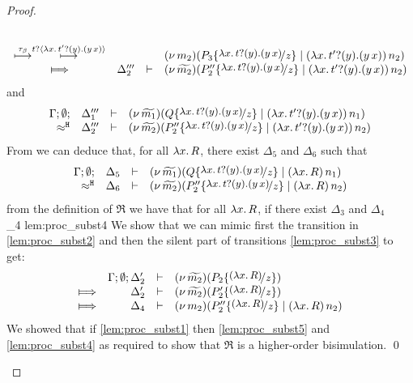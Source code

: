 \begin{proof}
\begin{enumerate}
\begin{itemize}
\begin{eqnarray}
\begin{array}{crll}
									\\
									{\hby{\btau}\hby{\bactinp{t}{\trvalx{t'}}}} &
												&&	\newsp{m_2}{P_3 \subst{\trvalx{t}}{z} \Par \appl{(\trvalx{t'})}{n_2}}
									\\
									\Hby{}	& \Delta_2''' & \proves & \newsp{\widetilde{m_2}}{P_2'' \subst{\trvalx{t}}{z} \Par \appl{(\trvalx{t'})}{n_2}}
								\end{array}
								\label{lem:proc_subst3}
							\end{eqnarray}
							and
							\begin{eqnarray*}
								\mhorel{\Gamma}{\Delta_1'''}{\newsp{\widetilde{m_1}}{Q \subst{\trvalx{t}}{z} \Par \appl{(\trvalx{t'})}{n_1}}}
								{\hwb}
								{\Delta_2'''}{}{\newsp{\widetilde{m_2}}{P_2'' \subst{\trvalx{t}}{z} \Par \appl{(\trvalx{t'})}{n_2}}}
							\end{eqnarray*}
							From  we can deduce that, for all $\lambda x.\,R$, there exist $\Delta_5$ and $ \Delta_6$ such that
							\begin{eqnarray*}
								\mhorel{\Gamma}{\Delta_5}{\newsp{\widetilde{m_1}}{Q \subst{\trvalx{t}}{z} \Par \appl{(\abs{x}{R})}{n_1}}}
								{\hwb}
								{\Delta_6}{}{\newsp{\widetilde{m_2}}{P_2'' \subst{\trvalx{t}}{z} \Par \appl{(\abs{x}{R})}{n_2}}}
							\end{eqnarray*}
							from the definition of $\Re$ we have that for all $\lambda x.\,R$, if there exist $\Delta_3$ and $\Delta_4$
								{\ \Re\ }
								{\Delta_4}{}
								{lem:proc_subst4}
							We show that we can mimic first the
							transition in \eqref{lem:proc_subst2} and then the silent part of
							transitions \eqref{lem:proc_subst3} to get:
							\begin{eqnarray}
								\begin{array}{crll}
										& \Gamma; \es; \Delta_2' &\proves& \newsp{\widetilde{m_2}}{P_2 \subst{(\abs{x}{R})}{z}}
									\\
									\Hby{}	&	\Delta_2'			& \proves&	\newsp{\widetilde{m_2}}{P_2' \subst{(\abs{x}{R})}{z}}
									\\
									\Hby{} &	\Delta_4			& \proves&	\newsp{m_2}{P_2'' \subst{(\abs{x}{R})}{z} \Par \appl{(\abs{x}{R})}{n_2}}
								\end{array}
								\label{lem:proc_subst5}
							\end{eqnarray}
							We showed that if \eqref{lem:proc_subst1} then \eqref{lem:proc_subst5} and \eqref{lem:proc_subst4}
							as required to show that $\Re$ is a higher-order bisimulation.							\qed
				\end{itemize}
	\end{enumerate}
\end{proof}



